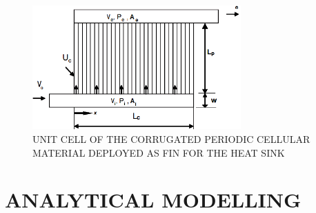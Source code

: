 \documentclass[twocolumn,10pt,cleanfoot]{ihmtc}
\begin{document}
%
\begin{figure}[ht]
\centerline{\includegraphics[width=80mm,scale=0.50]{unitcell.PNG}}
\vspace{-1.5ex}
\caption{\small{UNIT CELL OF THE CORRUGATED PERIODIC CELLULAR MATERIAL DEPLOYED AS FIN FOR THE HEAT SINK}}
\vspace{-2.2em}
\label{unitcell}
\end{figure}
%
\section{ANALYTICAL MODELLING}
\end{document}
